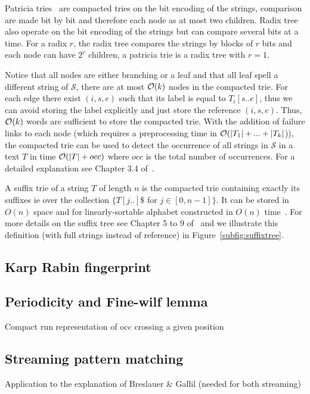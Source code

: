 Patricia tries~\cite{morrison1968patricia} are compacted tries on the bit encoding of the strings, comparison are made bit by bit and therefore each node as at most two children. Radix tree also operate on the bit encoding of the strings but can compare several bits at a time. For a radix $r$, the radix tree compares the strings by blocks of $r$ bits and each node can have $2^r$ children, a patricia trie is a radix tree with $r=1$.

Notice that all nodes are either branching or a leaf and that all leaf spell a different string of $\mathcal{S}$, there are at most $\mathcal{O}(k)$ nodes in the compacted trie.
For each edge there exist $(i,s,e)$ such that its label is equal to $T_i[s .. e]$, thus we can avoid storing the label explicitly and just store the reference $(i,s,e)$.
Thus, $\mathcal{O}(k)$ words are sufficient to store the compacted trie.
%
With the addition of failure links to each node (which requires a preprocessing time in $\mathcal{O}(|T_1| + ... +|T_k|$)), the compacted trie can be used to detect the occurrence of all strings in $\mathcal{S}$ in a text $T$ in time $\mathcal{O}(|T|+occ)$ where $occ$ is the total number of occurrences. For a detailed explanation see Chapter 3.4 of~\cite{Gusfield1997}. 


A suffix trie of a string $T$ of length $n$ is the compacted trie containing exactly its suffixes ie over the collection $\{T[j..]\$$ for $ j \in [0,n-1] \}$. It can be stored in $O(n)$ space and for linearly-sortable alphabet constructed in $O(n)$ time~\cite{Farach1997}. For more details on the suffix tree see Chapter 5 to 9 of~\cite{Gusfield1997} and we illustrate this definition (with full strings instead of reference) in Figure~\ref{subfig:suffixtree}.




\subsection{Karp Rabin fingerprint}

\subsection{Periodicity and Fine-wilf lemma}
Compact run representation of occ crossing a given position

\subsection{Streaming pattern matching}
Application to the explanation of Breslauer \& Gallil (needed for both streaming)

